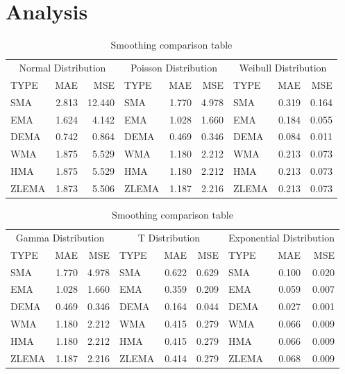 \documentclass{article}
\begin{document}
\hypertarget{analysis}{%
\section{Analysis}\label{analysis}}

\begin{table}[H]

\caption{\label{tab:unnamed-chunk-10}Smoothing comparison table}
\centering
\begin{tabular}[t]{lrrlrrlrr}
\toprule
\multicolumn{3}{c}{Normal Distribution} & \multicolumn{3}{c}{Poisson Distribution} & \multicolumn{3}{c}{Weibull Distribution} \\
\cmidrule(l{3pt}r{3pt}){1-3} \cmidrule(l{3pt}r{3pt}){4-6} \cmidrule(l{3pt}r{3pt}){7-9}
TYPE & MAE & MSE & TYPE & MAE & MSE & TYPE & MAE & MSE\\
\midrule
SMA & 2.813 & 12.440 & SMA & 1.770 & 4.978 & SMA & 0.319 & 0.164\\
EMA & 1.624 & 4.142 & EMA & 1.028 & 1.660 & EMA & 0.184 & 0.055\\
DEMA & 0.742 & 0.864 & DEMA & 0.469 & 0.346 & DEMA & 0.084 & 0.011\\
WMA & 1.875 & 5.529 & WMA & 1.180 & 2.212 & WMA & 0.213 & 0.073\\
HMA & 1.875 & 5.529 & HMA & 1.180 & 2.212 & HMA & 0.213 & 0.073\\
\addlinespace
ZLEMA & 1.873 & 5.506 & ZLEMA & 1.187 & 2.216 & ZLEMA & 0.213 & 0.073\\
\bottomrule
\end{tabular}
\end{table}

\begin{table}[H]

\caption{\label{tab:unnamed-chunk-11}Smoothing comparison table}
\centering
\begin{tabular}[t]{lrrlrrlrr}
\toprule
\multicolumn{3}{c}{Gamma Distribution} & \multicolumn{3}{c}{T Distribution} & \multicolumn{3}{c}{Exponential Distribution} \\
\cmidrule(l{3pt}r{3pt}){1-3} \cmidrule(l{3pt}r{3pt}){4-6} \cmidrule(l{3pt}r{3pt}){7-9}
TYPE & MAE & MSE & TYPE & MAE & MSE & TYPE & MAE & MSE\\
\midrule
SMA & 1.770 & 4.978 & SMA & 0.622 & 0.629 & SMA & 0.100 & 0.020\\
EMA & 1.028 & 1.660 & EMA & 0.359 & 0.209 & EMA & 0.059 & 0.007\\
DEMA & 0.469 & 0.346 & DEMA & 0.164 & 0.044 & DEMA & 0.027 & 0.001\\
WMA & 1.180 & 2.212 & WMA & 0.415 & 0.279 & WMA & 0.066 & 0.009\\
HMA & 1.180 & 2.212 & HMA & 0.415 & 0.279 & HMA & 0.066 & 0.009\\
\addlinespace
ZLEMA & 1.187 & 2.216 & ZLEMA & 0.414 & 0.279 & ZLEMA & 0.068 & 0.009\\
\bottomrule
\end{tabular}
\end{table}
\end{document}
